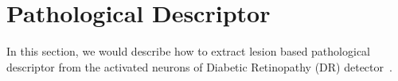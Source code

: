 \documentclass[letterpaper]{article} %
\begin{document}


\section{Pathological Descriptor}

In this section, we would describe how to extract lesion based pathological descriptor from the activated neurons of Diabetic Retinopathy (DR) detector~\cite{oO2016detector}.%


  

	
	
\end{document}
